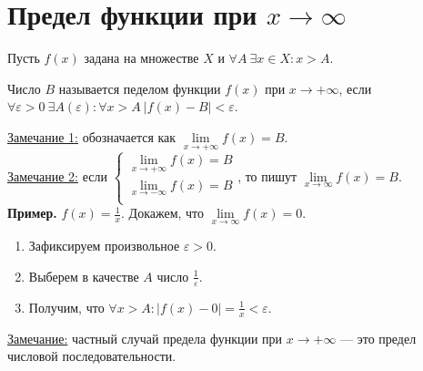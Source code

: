 \documentclass{article}
\begin{document}
    \section{Предел функции при \(x \to \infty\)}
    Пусть \(f(x)\) задана на множестве \(X\) и \(\forall A\ \exists x \in X: x > A\).
    \begin{definition}
        Число \(B\) называется педелом функции \(f(x)\) при \(x \to +\infty\), если
        \(
            \forall \varepsilon > 0\ \exists A(\varepsilon) : \forall x > A\ |f(x) - B| < \varepsilon
        \).
    \end{definition}
    \noindent
    \underline{Замечание 1:} обозначается как \(\lim\limits_{x \to +\infty}f(x) = B\).\\
    \underline{Замечание 2:} если \(
    \begin{cases}
        \lim\limits_{x \to +\infty}f(x) = B\\
        \lim\limits_{x \to -\infty}f(x) = B\\
    \end{cases}
    \), то пишут \(\lim\limits_{x \to \infty}f(x) = B\).\\
    \textbf{Пример.} \(\displaystyle f(x) = \frac{1}{x}\). Докажем, что \(\lim\limits_{x \to \infty}f(x) = 0\).
    \begin{enumerate}
        \item Зафиксируем произвольное \(\varepsilon > 0\). 
        \item Выберем в качестве \(A\) число \(\frac{1}{\varepsilon}\).
        \item Получим, что \(\displaystyle \forall x > A: |f(x) - 0| = \frac{1}{x} < \varepsilon\). 
    \end{enumerate}
    \noindent
    \underline{Замечание:} частный случай предела функции при \(x \to +\infty\) --- это предел числовой последовательности.
    
\end{document}
